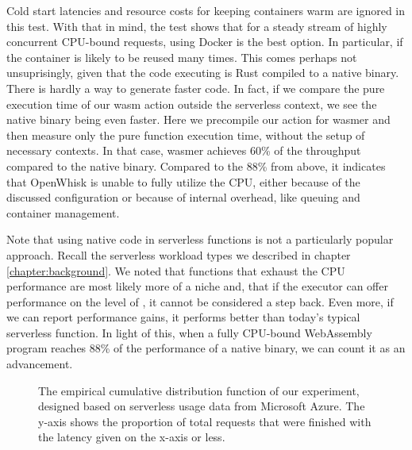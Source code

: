 Cold start latencies and resource costs for keeping containers warm are ignored in this test. With that in mind, the test shows that for a steady stream of highly concurrent CPU-bound requests, using Docker is the best option. In particular, if the container is likely to be reused many times. This comes perhaps not unsuprisingly, given that the code executing is Rust compiled to a native  binary. There is hardly a way to generate faster code. In fact, if we compare the pure execution time of our wasm action outside the serverless context, we see the native binary being even faster. Here we precompile our action for wasmer and then measure only the pure function execution time, without the setup of necessary contexts. In that case, wasmer achieves 60\% of the throughput compared to the native binary. Compared to the 88\% from above, it indicates that OpenWhisk is unable to fully utilize the CPU, either because of the discussed configuration or because of internal overhead, like queuing and container management. 

Note that using native code in serverless functions is not a particularly popular approach. Recall the serverless workload types we described in chapter \ref{chapter:background}. We noted that functions that exhaust the CPU performance are most likely more of a niche and, that if the executor can offer performance on the level of , it cannot be considered a step back. Even more, if we can report performance gains, it performs better than today's typical serverless function. In light of this, when a fully CPU-bound WebAssembly program reaches 88\% of the performance of a native binary, we can count it as an advancement. 


\begin{figure}
    \begin{center}
        
    \end{center}
    \caption{The empirical cumulative distribution function of our experiment, designed based on serverless usage data from Microsoft Azure. The y-axis shows the proportion of total requests that were finished with the latency given on the x-axis or less.}
    \label{fig:pc-load-zipf}
\end{figure}

